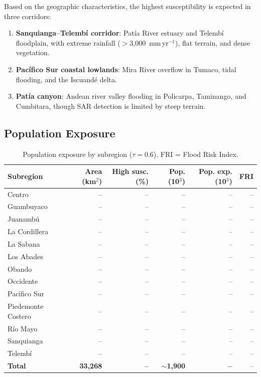 \documentclass{article}
\begin{document}
Based on the geographic characteristics, the highest susceptibility is expected in three corridors:

\begin{enumerate}
    \item \textbf{Sanquianga--Telemb\'i corridor}: Pat\'ia River estuary and Telemb\'i floodplain, with extreme rainfall ($>$3,000~mm\,yr$^{-1}$), flat terrain, and dense vegetation.
    \item \textbf{Pac\'ifico Sur coastal lowlands}: Mira River overflow in Tumaco, tidal flooding, and the Iscuand\'e delta.
    \item \textbf{Pat\'ia canyon}: Andean river valley flooding in Policarpa, Taminango, and Cumbitara, though SAR detection is limited by steep terrain.
\end{enumerate}

\subsection{Population Exposure}


\begin{table}[htbp]
\caption{Population exposure by subregion ($\tau = 0.6$). FRI = Flood Risk Index.}
\label{tab:exposure}
\centering
\footnotesize
\begin{tabular}{lrrrrr}
\toprule
\textbf{Subregion} & \textbf{Area (km$^2$)} & \textbf{High susc. (\%)} & \textbf{Pop. (10$^3$)} & \textbf{Pop. exp. (10$^3$)} & \textbf{FRI} \\
\midrule
Centro              & -- & -- & -- & -- & -- \\
Guambuyaco          & -- & -- & -- & -- & -- \\
Juanamb\'u          & -- & -- & -- & -- & -- \\
La Cordillera       & -- & -- & -- & -- & -- \\
La Sabana           & -- & -- & -- & -- & -- \\
Los Abades          & -- & -- & -- & -- & -- \\
Obando              & -- & -- & -- & -- & -- \\
Occidente           & -- & -- & -- & -- & -- \\
Pac\'ifico Sur      & -- & -- & -- & -- & -- \\
Piedemonte Costero  & -- & -- & -- & -- & -- \\
R\'io Mayo          & -- & -- & -- & -- & -- \\
Sanquianga          & -- & -- & -- & -- & -- \\
Telemb\'i           & -- & -- & -- & -- & -- \\
\midrule
\textbf{Total}      & \textbf{33,268} & \textbf{--} & \textbf{$\sim$1,900} & \textbf{--} & -- \\
\bottomrule
\end{tabular}
\end{table}
\end{document}
